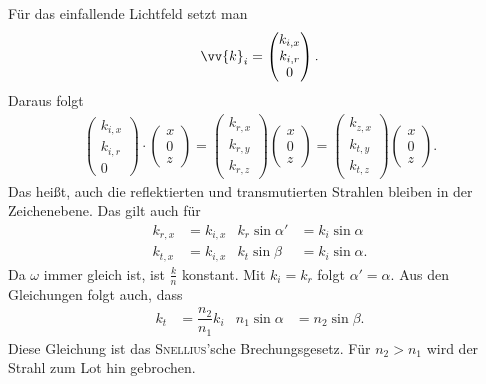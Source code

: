 \documentclass[a4paper,12pt]{article}
\numberwithin{equation}{section}
\begin{document}
Für das einfallende Lichtfeld setzt man
\begin{align} 
        \vv{k}_i=\begin{pmatrix}
                k_{i,x}\\k_{i,r}\\0
        \end{pmatrix}
.\end{align} 
Daraus folgt
\begin{align} 
        \begin{pmatrix}
                k_{i,x}\\k_{i,r}\\0
        \end{pmatrix}\cdot \begin{pmatrix}
                x\\0\\z
        \end{pmatrix}=\begin{pmatrix}
                k_{r,x}\\k_{r,y}\\k_{r,z}
        \end{pmatrix}\begin{pmatrix}
                x\\0\\z
        \end{pmatrix}=\begin{pmatrix}
                k_{z,x}\\k_{t,y}\\k_{t,z}
        \end{pmatrix}\begin{pmatrix}
                x\\0\\z
        \end{pmatrix}
.\end{align} 
Das heißt, auch die reflektierten und transmutierten Strahlen bleiben in der Zeichenebene. Das gilt auch für
\begin{align} 
        k_{r,x}&=k_{i,x}&k_r\sin \alpha '&=k_i\sin \alpha \\
        k_{t,x}&=k_{i,x}&k_t\sin \beta &=k_i\sin \alpha 
.\end{align} 
Da $\omega $ immer gleich ist, ist $\tfrac{k}{n}$ konstant. Mit $k_i=k_r$ folgt $\alpha '=\alpha $. Aus den Gleichungen folgt auch, dass 
\begin{align} 
        k_t&=\dfrac{n_2}{n_1}k_i&n_1\sin \alpha &=n_2\sin \beta 
.\end{align} 
Diese Gleichung ist das \textsc{Snellius}'sche Brechungsgesetz. Für $n_2>n_1$ wird der Strahl zum Lot hin gebrochen.
\end{document}
